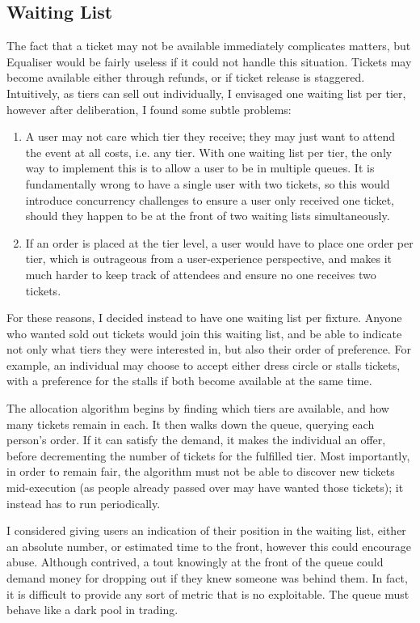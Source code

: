 \documentclass[12pt,a4paper]{bhamdissertation}
\begin{document}
\subsection{Waiting List}

The fact that a ticket may not be available immediately complicates matters, but Equaliser would be fairly useless if it could not handle this situation. Tickets may become available either through refunds, or if ticket release is staggered. Intuitively, as tiers can sell out individually, I envisaged one waiting list per tier, however after deliberation, I found some subtle problems:

\begin{enumerate}
    \item A user may not care which tier they receive; they may just want to attend the event at all costs, i.e. any tier. With one waiting list per tier, the only way to implement this is to allow a user to be in multiple queues. It is fundamentally wrong to have a single user with two tickets, so this would introduce concurrency challenges to ensure a user only received one ticket, should they happen to be at the front of two waiting lists simultaneously.
    \item If an order is placed at the tier level, a user would have to place one order per tier, which is outrageous from a user-experience perspective, and makes it much harder to keep track of attendees and ensure no one receives two tickets.
\end{enumerate}

For these reasons, I decided instead to have one waiting list per fixture. Anyone who wanted sold out tickets would join this waiting list, and be able to indicate not only what tiers they were interested in, but also their order of preference. For example, an individual may choose to accept either dress circle or stalls tickets, with a preference for the stalls if both become available at the same time.

The allocation algorithm begins by finding which tiers are available, and how many tickets remain in each. It then walks down the queue, querying each person's order. If it can satisfy the demand, it makes the individual an offer, before decrementing the number of tickets for the fulfilled tier. Most importantly, in order to remain fair, the algorithm must not be able to discover new tickets mid-execution (as people already passed over may have wanted those tickets); it instead has to run periodically.

I considered giving users an indication of their position in the waiting list, either an absolute number, or estimated time to the front, however this could encourage abuse. Although contrived, a tout knowingly at the front of the queue could demand money for dropping out if they knew someone was behind them. In fact, it is difficult to provide any sort of metric that is no exploitable. The queue must behave like a dark pool in trading.
\end{document}
